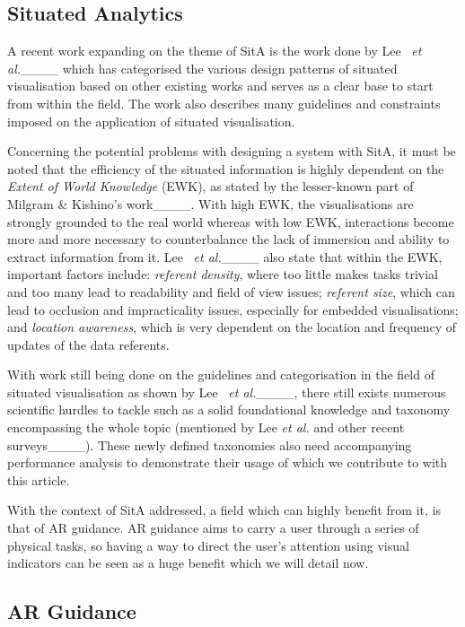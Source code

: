 \subsection{Situated Analytics}

A recent work expanding on the theme of SitA is the work done by Lee ~\textit{et al.}____ which has categorised the various design patterns of situated visualisation based on other existing works and serves as a clear base to start from within the field. The work also describes many guidelines and constraints imposed on the application of situated visualisation.

Concerning the potential problems with designing a system with SitA, it must be noted that the efficiency of the situated information is highly dependent on the \textit{Extent of World Knowledge} (EWK), as stated by the lesser-known part of Milgram \& Kishino's work____. 
With high EWK, the visualisations are strongly grounded to the real world whereas with low EWK, interactions become more and more necessary to counterbalance the lack of immersion and ability to extract information from it. 
Lee ~\textit{et al.}____ also state that within the EWK, important factors include: \textit{referent density}, where too little makes tasks trivial and too many lead to readability and field of view issues; \textit{referent size}, which can lead to occlusion and impracticality issues, especially for embedded visualisations; and \textit{location awareness}, which is very dependent on the location and frequency of updates of the data referents.

With work still being done on the guidelines and categorisation in the field of situated visualisation as shown by Lee ~\textit{et al.}____, there still exists numerous scientific hurdles to tackle such as a solid foundational knowledge and taxonomy encompassing the whole topic (mentioned by Lee \textit{et al.} and other recent surveys____).
These newly defined taxonomies also need accompanying performance analysis to demonstrate their usage of which we contribute to with this article.

With the context of SitA addressed, a field which can highly benefit from it, is that of AR guidance. AR guidance aims to carry a user through a series of physical tasks, so having a way to direct the user's attention using visual indicators can be seen as a huge benefit which we will detail now.

\subsection{AR Guidance}
\label{ar_guidance}

